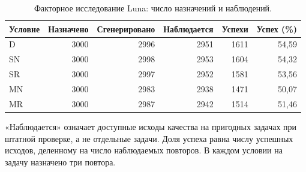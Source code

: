 \begin{table}[H]\centering
\caption{Факторное исследование Luna: число назначений и наблюдений.}
\label{tab:scale-quality}
\begin{tabular}{lrrrrr}\toprule
Условие & Назначено & Сгенерировано & Наблюдается & Успехи & Успех (\%)\\\midrule
D & 3000 & 2996 & 2951 & 1611 & 54,59\\
SN & 3000 & 2998 & 2953 & 1604 & 54,32\\
SR & 3000 & 2997 & 2952 & 1581 & 53,56\\
MN & 3000 & 2983 & 2938 & 1471 & 50,07\\
MR & 3000 & 2987 & 2942 & 1514 & 51,46\\
\bottomrule\end{tabular}
\par\smallskip\noindent «Наблюдается» означает доступные исходы качества на пригодных задачах при штатной проверке, а не отдельные задачи. Доля успеха равна числу успешных исходов, деленному на число наблюдаемых повторов. В каждом условии на задачу назначено три повтора.
\end{table}

